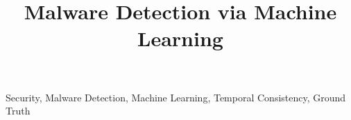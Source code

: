 \documentclass[conference]{IEEEtran}
\begin{document}
\title{Malware Detection via Machine Learning}


\maketitle

\begin{abstract}

\end{abstract}

\begin{IEEEkeywords}
Security,
Malware Detection,
Machine Learning,
Temporal Consistency,
Ground Truth
\end{IEEEkeywords}













%
% 
\end{document}
